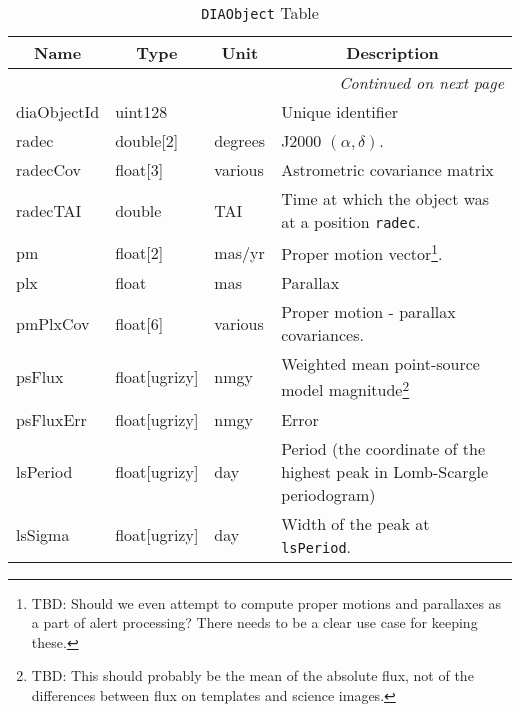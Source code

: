 \documentclass[12pt]{article}
\newcommand{\code}[1]{\texttt{#1}}
\newcommand{\DIAObject}{\code{DIAObject}\xspace}
\begin{document}
\begin{center}
\begin{longtable}{p{3cm}p{2cm}p{2cm}p{5cm}}
\caption[\DIAObject Table]{\DIAObject Table} \\

\hline \multicolumn{1}{c}{\bf Name} & \multicolumn{1}{c}{\bf Type} & \multicolumn{1}{c}{\bf Unit} & \multicolumn{1}{c}{\bf Description} \\ \hline
\endhead

\hline \multicolumn{4}{r}{{\em Continued on next page}} \\
\endfoot

\hline\hline
\endlastfoot

diaObjectId & uint128 & ~ & Unique identifier \\ 

radec & double[2] & degrees & J2000 $(\alpha, \delta)$. \\ 

radecCov & float[3] & various & Astrometric covariance matrix \\ 

radecTAI & double & TAI & Time at which the object was at a position \texttt{radec}. \\ 

pm & float[2] & mas/yr & Proper motion vector\footnote{TBD: Should we even attempt to compute proper motions and parallaxes as a part of alert processing? There needs to be a clear use case for keeping these.}. \\ 

plx & float & mas & Parallax \\ 

pmPlxCov & float[6] & various & Proper motion - parallax covariances. \\ 

psFlux & float[ugrizy] & nmgy & Weighted mean point-source model magnitude\footnote{TBD: This should probably be the mean of the absolute flux, not of the differences between flux on templates and science images.} \\ 

psFluxErr & float[ugrizy] & nmgy & Error  \\ 

lsPeriod  & float[ugrizy] & day & Period (the coordinate of the highest peak in Lomb-Scargle periodogram) \\

lsSigma  & float[ugrizy] & day & Width of the peak at \texttt{lsPeriod}. \\


\end{longtable}
\end{center}
\end{document}
